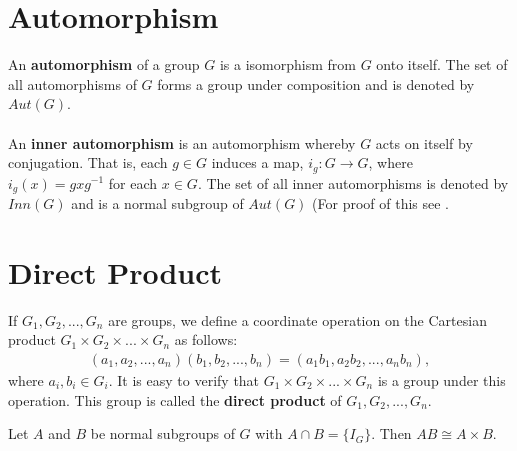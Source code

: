 \section{Automorphism}

\begin{definition} An \textbf{automorphism} of a group $G$ is a isomorphism from $G$ onto itself. The set of all automorphisms of $G$ forms a group under composition and is denoted by $Aut(G)$.\\
\\
An \textbf{inner automorphism} is an automorphism whereby $G$ acts on itself by conjugation. That is, each $g \in G$ induces a map, $i_g : G \rightarrow G$, where $i_g(x) = g x g^{-1}$ for each $x \in G$. The set of all inner automorphisms is denoted by $Inn(G)$ and is a normal subgroup of $Aut(G)$ (For proof of this see \cite[p.104]{bhattacharya}.
\end{definition}

\section{Direct Product}

\begin{definition} If $G_1, G_2,...,G_n$ are groups, we define a coordinate operation on the Cartesian product $G_1 \times G_2 \times...\times G_n$ as follows:
\begin{align*} (a_1, a_2, ..., a_n) (b_1, b_2, ..., b_n) = (a_1 b_1, a_2 b_2, ..., a_n b_n),
\end{align*}
where $a_i, b_i \in G_i$. It is easy to verify that $G_1 \times G_2 \times...\times G_n$ is a group under this operation. This group is called the \textbf{direct product} of $G_1, G_2,...,G_n$.
\end{definition}

\begin{lemma} \label{directproductN} Let $A$ and $B$ be normal subgroups of $G$ with $A \cap B = \{ I_G \}$. Then $AB \cong A \times B$.
\end{lemma}

